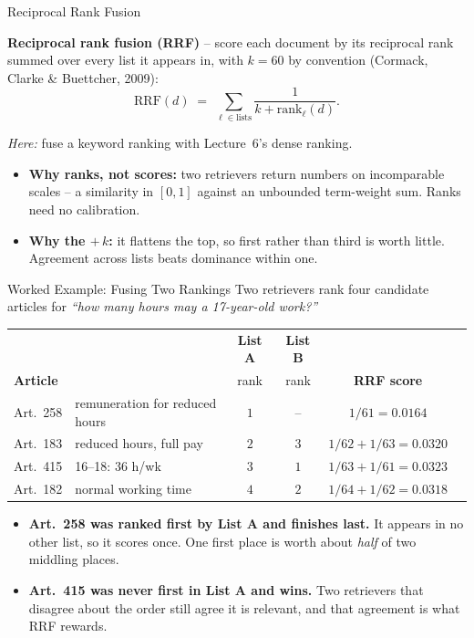 \begin{frame}{Reciprocal Rank Fusion}
\begin{rldefinition}
\textbf{Reciprocal rank fusion (RRF)} -- score each document by its reciprocal rank summed over every list it appears in, with $k = 60$ by convention (Cormack, Clarke \& Buettcher, 2009):
\vspace{-0.4em}
\[
  \mathrm{RRF}(d) \;=\; \sum_{\ell \in \text{lists}} \frac{1}{k + \mathrm{rank}_{\ell}(d)} .
\]
\vspace{-1.2em}

\emph{Here:} fuse a keyword ranking with Lecture~6's dense ranking.
\end{rldefinition}
\pause
\begin{itemize}
  \item \textbf{Why ranks, not scores:} two retrievers return numbers on incomparable scales -- a similarity in $[0,1]$ against an unbounded term-weight sum. Ranks need no calibration.
  \pause
  \item \textbf{Why the $+\,k$:} it flattens the top, so first rather than third is worth little. Agreement across lists beats dominance within one.
\end{itemize}
\end{frame}

\begin{frame}{Worked Example: Fusing Two Rankings}
\small
Two retrievers rank four candidate articles for \emph{``how many hours may a 17-year-old work?''}
\smallskip

\centering
\footnotesize
\begin{tabular}{@{}llcccl@{}}
& & \textbf{List A} & \textbf{List B} & & \\
\textbf{Article} & & rank & rank & \textbf{RRF score} & \\
\hline
Art.~258 & remuneration for reduced hours & $1$ & --      & $1/61 = 0.0164$ & \\
Art.~183 & reduced hours, full pay        & $2$ & $3$     & $1/62 + 1/63 = 0.0320$ & \\
\textcolor{RLGreen}{Art.~415} & \textcolor{RLGreen}{16--18: 36 h/wk} & $3$ & $1$ & \textcolor{RLGreen}{$1/63 + 1/61 = 0.0323$} & \\
Art.~182 & normal working time            & $4$ & $2$     & $1/64 + 1/62 = 0.0318$ & \\
\end{tabular}
\pause

\vspace{0.5em}
\begin{itemize}
  \item \textbf{Art.~258 was ranked first by List A and finishes last.} It appears in no other list, so it scores once. One first place is worth about \emph{half} of two middling places.
  \pause
  \item \textbf{Art.~415 was never first in List A and wins.} Two retrievers that disagree about the order still agree it is relevant, and that agreement is what RRF rewards.
\end{itemize}
\end{frame}

